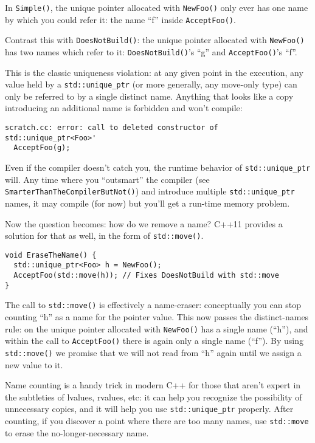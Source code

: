 In \texttt{Simple()}, the unique pointer allocated with \texttt{NewFoo()} only ever has one name by which you could refer it: the name \enquote{f} inside \texttt{AcceptFoo()}.

Contrast this with \texttt{DoesNotBuild()}: the unique pointer allocated with \texttt{NewFoo()} has two names which refer to it: \texttt{DoesNotBuild()}’s \enquote{g} and \texttt{AcceptFoo()}’s \enquote{f}.

This is the classic uniqueness violation: at any given point in the execution, any value held by a \texttt{std::unique_ptr} (or more generally, any move-only type) can only be referred to by a single distinct name. Anything that looks like a copy introducing an additional name is forbidden and won’t compile:

\begin{verbatim}
scratch.cc: error: call to deleted constructor of std::unique_ptr<Foo>'
  AcceptFoo(g);
\end{verbatim}

Even if the compiler doesn’t catch you, the runtime behavior of \texttt{std::unique_ptr} will. Any time where you \enquote{outsmart} the compiler (see \texttt{SmarterThanTheCompilerButNot()}) and introduce multiple \texttt{std::unique_ptr} names, it may compile (for now) but you’ll get a run-time memory problem.

Now the question becomes: how do we remove a name? C++11 provides a solution for that as well, in the form of \texttt{std::move()}.

\begin{verbatim}
void EraseTheName() {
  std::unique_ptr<Foo> h = NewFoo();
  AcceptFoo(std::move(h)); // Fixes DoesNotBuild with std::move
}
\end{verbatim}

The call to \texttt{std::move()} is effectively a name-eraser: conceptually you can stop counting \enquote{h} as a name for the pointer value. This now passes the distinct-names rule: on the unique pointer allocated with \texttt{NewFoo()} has a single name (\enquote{h}), and within the call to \texttt{AcceptFoo()} there is again only a single name (\enquote{f}). By using \texttt{std::move()} we promise that we will not read from \enquote{h} again until we assign a new value to it.

Name counting is a handy trick in modern C++ for those that aren’t expert in the subtleties of lvalues, rvalues, etc: it can help you recognize the possibility of unnecessary copies, and it will help you use \texttt{std::unique_ptr} properly. After counting, if you discover a point where there are too many names, use \texttt{std::move} to erase the no-longer-necessary name.

